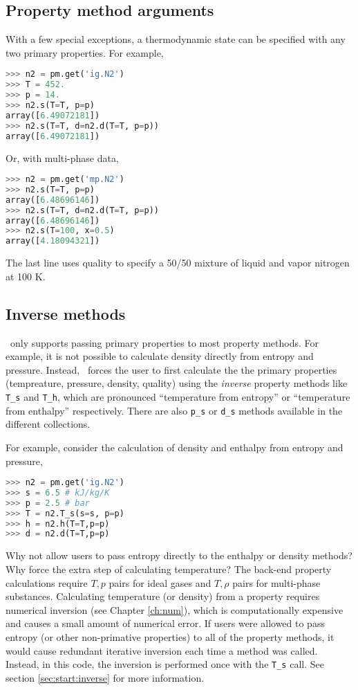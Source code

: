 \subsection{Property method arguments}

With a few special exceptions, a thermodynamic state can be specified with any two primary properties.  For example,
\begin{lstlisting}[language=Python]
>>> n2 = pm.get('ig.N2')
>>> T = 452.
>>> p = 14.
>>> n2.s(T=T, p=p)
array([6.49072181])
>>> n2.s(T=T, d=n2.d(T=T, p=p))
array([6.49072181])
\end{lstlisting}
Or, with multi-phase data,
\begin{lstlisting}[language=Python]
>>> n2 = pm.get('mp.N2')
>>> n2.s(T=T, p=p)
array([6.48696146])
>>> n2.s(T=T, d=n2.d(T=T, p=p))
array([6.48696146])
>>> n2.s(T=100, x=0.5)
array([4.18094321])
\end{lstlisting}
The last line uses quality to specify a 50/50 mixture of liquid and vapor nitrogen at 100 K.

\subsection{Inverse methods}

\PM\ only supports passing primary properties to most property methods.  For example, it is not possible to calculate density directly from entropy and pressure.  Instead, \PM\ forces the user to first calculate the the primary properties (tempreature, pressure, density, quality) using the \emph{inverse} property methods like \verb|T_s| and \verb|T_h|, which are pronounced ``temperature from entropy'' or ``temperature from enthalpy'' respectively.  There are also \verb|p_s| or \verb|d_s| methods available in the different collections.

For example, consider the calculation of density and enthalpy from entropy and pressure,
\begin{lstlisting}[language=Python]
>>> n2 = pm.get('ig.N2')
>>> s = 6.5 # kJ/kg/K
>>> p = 2.5 # bar
>>> T = n2.T_s(s=s, p=p)
>>> h = n2.h(T=T,p=p)
>>> d = n2.d(T=T,p=p)
\end{lstlisting}

Why not allow users to pass entropy directly to the enthalpy or density methods?  Why force the extra step of calculating temperature?  The back-end property calculations require $T,p$ pairs for ideal gases and $T,\rho$ pairs for multi-phase substances.  Calculating temperature (or density) from a property requires numerical inversion (see Chapter \ref{ch:num}), which is computationally expensive and causes a small amount of numerical error.  If users were allowed to pass entropy (or other non-primative properties) to all of the property methods, it would cause redundant iterative inversion each time a method was called.  Instead, in this code, the inversion is performed once with the \verb|T_s| call.  See section \ref{sec:start:inverse} for more information.

